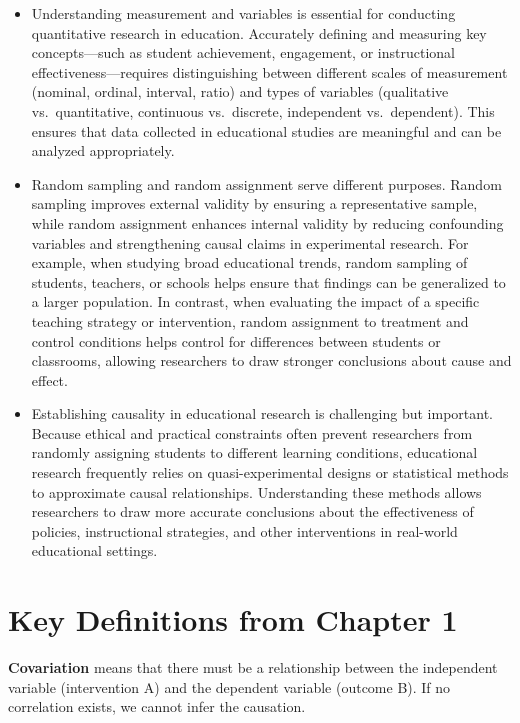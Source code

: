 \documentclass[
  letterpaper,
  DIV=11,
  numbers=noendperiod]{scrreprt}
\begin{document}
\begin{itemize}
\item
  Understanding measurement and variables is essential for conducting
  quantitative research in education. Accurately defining and measuring
  key concepts---such as student achievement, engagement, or
  instructional effectiveness---requires distinguishing between
  different scales of measurement (nominal, ordinal, interval, ratio)
  and types of variables (qualitative vs.~quantitative, continuous
  vs.~discrete, independent vs.~dependent). This ensures that data
  collected in educational studies are meaningful and can be analyzed
  appropriately.
\item
  Random sampling and random assignment serve different purposes. Random
  sampling improves external validity by ensuring a representative
  sample, while random assignment enhances internal validity by reducing
  confounding variables and strengthening causal claims in experimental
  research. For example, when studying broad educational trends, random
  sampling of students, teachers, or schools helps ensure that findings
  can be generalized to a larger population. In contrast, when
  evaluating the impact of a specific teaching strategy or intervention,
  random assignment to treatment and control conditions helps control
  for differences between students or classrooms, allowing researchers
  to draw stronger conclusions about cause and effect.
\item
  Establishing causality in educational research is challenging but
  important. Because ethical and practical constraints often prevent
  researchers from randomly assigning students to different learning
  conditions, educational research frequently relies on
  quasi-experimental designs or statistical methods to approximate
  causal relationships. Understanding these methods allows researchers
  to draw more accurate conclusions about the effectiveness of policies,
  instructional strategies, and other interventions in real-world
  educational settings.
\end{itemize}

\section*{Key Definitions from Chapter
1}\label{key-definitions-from-chapter-1}


\textbf{Covariation} means that there must be a relationship between the
independent variable (intervention A) and the dependent variable
(outcome B). If no correlation exists, we cannot infer the causation.
\end{document}
